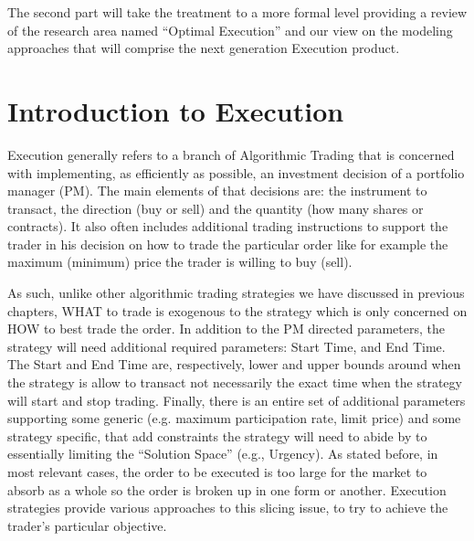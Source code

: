 The second part will take the treatment to a more formal level providing a review of  the research area named ``Optimal Execution'' and our view on the modeling approaches that will comprise the next generation Execution product.



\section{Introduction to Execution}

Execution generally refers to a branch of Algorithmic Trading that is concerned with  implementing, as efficiently as possible, an investment decision of a portfolio manager (PM). The main elements of that decisions are: the instrument to transact, the direction (buy or sell) and the quantity (how many shares or contracts). It also often includes additional trading instructions to support the trader in his decision on how to trade the particular order like for example the maximum (minimum) price the trader is willing to buy (sell). 


As such, unlike other algorithmic trading strategies we have discussed in previous chapters, WHAT to trade is exogenous to the strategy which is only concerned on HOW to best trade the order. In addition to the PM directed parameters, the strategy will need additional  required parameters: Start Time, and End Time. The Start and End Time are, respectively, lower and upper bounds around when the strategy is allow to transact not necessarily the exact time when the strategy will start and stop trading. Finally, there is an entire set of additional parameters supporting some generic (e.g. maximum participation rate, limit price) and some strategy specific, that add constraints the strategy will need to abide by to essentially limiting the ``Solution Space'' (e.g., Urgency). As stated before, in most relevant cases, the order to be executed is too large for the market to absorb as a whole so the order is broken up in one form or another. Execution strategies provide various approaches to this slicing issue, to try to achieve the trader's particular objective.



